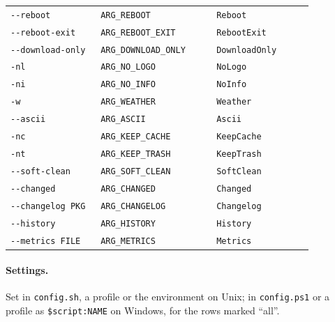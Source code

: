 \documentclass[11pt,a4paper]{article}
\begin{document}
\begin{center}
\begin{longtable}{@{}p{0.28\linewidth} p{0.36\linewidth} p{0.30\linewidth}@{}}
\texttt{-{}-reboot}                  & \texttt{ARG\_REBOOT} & \texttt{Reboot} \\
\texttt{-{}-reboot-exit}             & \texttt{ARG\_REBOOT\_EXIT} & \texttt{RebootExit} \\
\texttt{-{}-download-only}           & \texttt{ARG\_DOWNLOAD\_ONLY} & \texttt{DownloadOnly} \\
\texttt{-nl}                         & \texttt{ARG\_NO\_LOGO} & \texttt{NoLogo} \\
\texttt{-ni}                         & \texttt{ARG\_NO\_INFO} & \texttt{NoInfo} \\
\texttt{-w}                          & \texttt{ARG\_WEATHER} & \texttt{Weather} \\
\texttt{-{}-ascii}                   & \texttt{ARG\_ASCII} & \texttt{Ascii} \\
\texttt{-nc}                         & \texttt{ARG\_KEEP\_CACHE} & \texttt{KeepCache} \\
\texttt{-nt}                         & \texttt{ARG\_KEEP\_TRASH} & \texttt{KeepTrash} \\
\texttt{-{}-soft-clean}              & \texttt{ARG\_SOFT\_CLEAN} & \texttt{SoftClean} \\
\texttt{-{}-changed}                 & \texttt{ARG\_CHANGED} & \texttt{Changed} \\
\texttt{-{}-changelog PKG}           & \texttt{ARG\_CHANGELOG} & \texttt{Changelog} \\
\texttt{-{}-history}                 & \texttt{ARG\_HISTORY} & \texttt{History} \\
\texttt{-{}-metrics FILE}            & \texttt{ARG\_METRICS} & \texttt{Metrics} \\
\bottomrule
\end{longtable}
\end{center}

\paragraph{Settings.} Set in \texttt{config.sh}, a profile or the
environment on Unix; in \texttt{config.ps1} or a profile as
\verb|$script:NAME| on Windows, for the rows marked ``all''.
\end{document}
